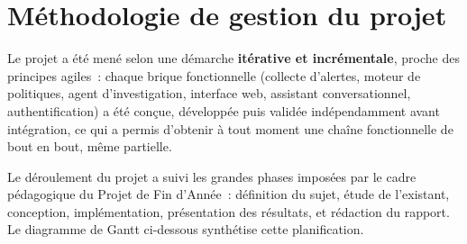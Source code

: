 \section{Méthodologie de gestion du projet}

Le projet a été mené selon une démarche \textbf{itérative et incrémentale},
proche des principes agiles~: chaque brique fonctionnelle (collecte
d'alertes, moteur de politiques, agent d'investigation, interface web,
assistant conversationnel, authentification) a été conçue, développée puis
validée indépendamment avant intégration, ce qui a permis d'obtenir à tout
moment une chaîne fonctionnelle de bout en bout, même partielle.

Le déroulement du projet a suivi les grandes phases imposées par le cadre
pédagogique du Projet de Fin d'Année~: définition du sujet, étude de
l'existant, conception, implémentation, présentation des résultats, et
rédaction du rapport. Le diagramme de Gantt ci-dessous synthétise cette
planification.

